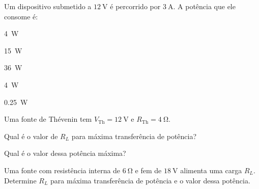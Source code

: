 \begin{questao}[1]{}
Um dispositivo submetido a $\SI{12}{\volt}$ é percorrido por $\SI{3}{\ampere}$. A
potência que ele consome é:
\begin{alternativas}[3]
\item \SI{4}{\watt}
\item \SI{15}{\watt}
\item \SI{36}{\watt}
\item \SI{4}{\watt}
\item \SI{0.25}{\watt}
\end{alternativas}
\end{questao}

\blocoaplicacao

\begin{questao}[2]{}
Uma fonte de Thévenin tem $V_{\text{Th}} = \SI{12}{\volt}$ e
$R_{\text{Th}} = \SI{4}{\ohm}$.
\begin{itensq}
\item Qual é o valor de $R_L$ para máxima transferência de potência?
\item Qual é o valor dessa potência máxima?
\end{itensq}
\end{questao}

\begin{questao}[2]{}
Uma fonte com resistência interna de $\SI{6}{\ohm}$ e fem de $\SI{18}{\volt}$
alimenta uma carga $R_L$. Determine $R_L$ para máxima transferência de potência e
o valor dessa potência.
\end{questao}

